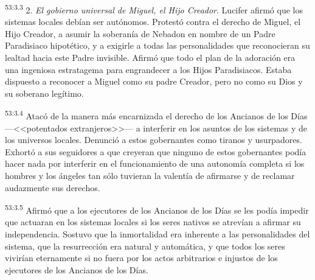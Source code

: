 \par
\textsuperscript{53:3.3} 2. \textit{El gobierno universal de Miguel, el Hijo Creador}. Lucifer afirmó que los sistemas locales debían ser autónomos. Protestó contra el derecho de Miguel, el Hijo Creador, a asumir la soberanía de Nebadon en nombre de un Padre Paradisiaco hipotético, y a exigirle a todas las personalidades que reconocieran su lealtad hacia este Padre invisible. Afirmó que todo el plan de la adoración era una ingeniosa estratagema para engrandecer a los Hijos Paradisiacos. Estaba dispuesto a reconocer a Miguel como su padre Creador, pero no como su Dios y su soberano legítimo.

\par
\textsuperscript{53:3.4} Atacó de la manera más encarnizada el derecho de los Ancianos de los Días ---<<potentados extranjeros>>--- a interferir en los asuntos de los sistemas y de los universos locales. Denunció a estos gobernantes como tiranos y usurpadores. Exhortó a sus seguidores a que creyeran que ninguno de estos gobernantes podía hacer nada por interferir en el funcionamiento de una autonomía completa si los hombres y los ángeles tan sólo tuvieran la valentía de afirmarse y de reclamar audazmente sus derechos.

\par
\textsuperscript{53:3.5} Afirmó que a los ejecutores de los Ancianos de los Días se les podía impedir que actuaran en los sistemas locales si los seres nativos se atrevían a afirmar su independencia. Sostuvo que la inmortalidad era inherente a las personalidades del sistema, que la resurrección era natural y automática, y que todos los seres vivirían eternamente si no fuera por los actos arbitrarios e injustos de los ejecutores de los Ancianos de los Días.

